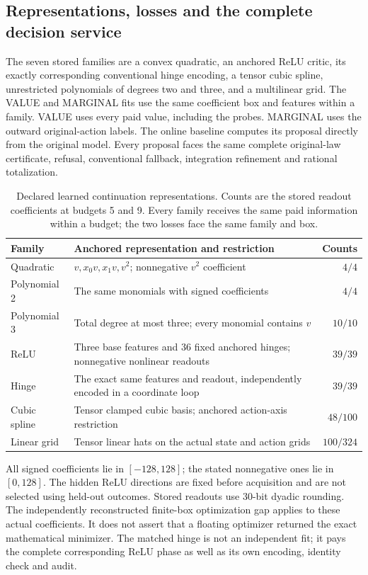 \subsection{Representations, losses and the complete decision service}
\label{subsec:methods121}

The seven stored families are a convex quadratic, an anchored ReLU critic,
its exactly corresponding conventional hinge encoding, a tensor cubic
spline, unrestricted polynomials of degrees two and three, and a multilinear
grid. The VALUE and MARGINAL fits use the same coefficient box and features
within a family. VALUE uses every paid value, including the probes. MARGINAL
uses the outward original-action labels. The online baseline computes its
proposal directly from the original model. Every proposal faces the same
complete original-law certificate, refusal, conventional fallback,
integration refinement and rational totalization.

\begin{table}[t]
\centering\small
\caption{Declared learned continuation representations. Counts are the stored
readout coefficients at budgets 5 and 9. Every family receives the same paid
information within a budget; the two losses face the same family and box.}
\label{tab:representations121}
\begin{tabular}{p{}p{}r}
\toprule
Family & Anchored representation and restriction & Counts\\
\midrule
Quadratic & $v,x_0v,x_1v,v^2$; nonnegative $v^2$ coefficient & $4/4$\\
Polynomial 2 & The same monomials with signed coefficients & $4/4$\\
Polynomial 3 & Total degree at most three; every monomial contains $v$ & $10/10$\\
ReLU & Three base features and 36 fixed anchored hinges; nonnegative nonlinear readouts & $39/39$\\
Hinge & The exact same features and readout, independently encoded in a coordinate loop & $39/39$\\
Cubic spline & Tensor clamped cubic basis; anchored action-axis restriction & $48/100$\\
Linear grid & Tensor linear hats on the actual state and action grids & $100/324$\\
\bottomrule
\end{tabular}
\end{table}

All signed coefficients lie in $[-128,128]$; the stated nonnegative ones lie
in $[0,128]$. The hidden ReLU directions are fixed before acquisition and
are not selected using held-out outcomes. Stored readouts use 30-bit dyadic
rounding. The independently reconstructed finite-box optimization gap applies
to these actual coefficients. It does not assert that a floating optimizer
returned the exact mathematical minimizer. The matched hinge is not an
independent fit; it pays the complete corresponding ReLU phase as well as
its own encoding, identity check and audit.

